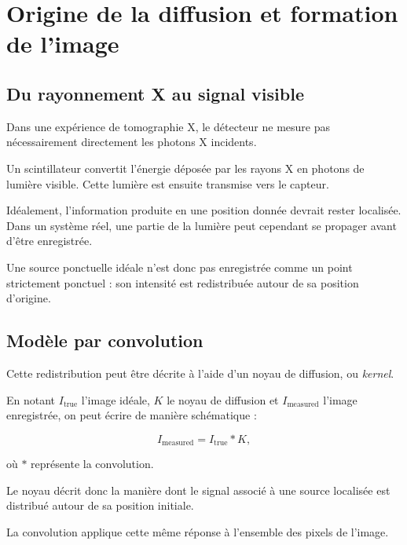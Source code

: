 \documentclass[11pt,a4paper]{report}
\begin{document}

\chapter{Origine de la diffusion et formation de l'image}

\section{Du rayonnement X au signal visible}

Dans une expérience de tomographie X, le détecteur ne mesure pas
nécessairement directement les photons X incidents.

Un scintillateur convertit l'énergie déposée par les rayons X en photons
de lumière visible. Cette lumière est ensuite transmise vers le capteur.

Idéalement, l'information produite en une position donnée devrait rester
localisée. Dans un système réel, une partie de la lumière peut cependant
se propager avant d'être enregistrée.

Une source ponctuelle idéale n'est donc pas enregistrée comme un point
strictement ponctuel : son intensité est redistribuée autour de sa
position d'origine.

\section{Modèle par convolution}

Cette redistribution peut être décrite à l'aide d'un noyau de diffusion,
ou \textit{kernel}.

En notant $I_{\mathrm{true}}$ l'image idéale, $K$ le noyau de diffusion et
$I_{\mathrm{measured}}$ l'image enregistrée, on peut écrire de manière
schématique :

\begin{equation}
I_{\mathrm{measured}}
=
I_{\mathrm{true}} * K,
\label{eq:image_convolution}
\end{equation}

où $*$ représente la convolution.

Le noyau décrit donc la manière dont le signal associé à une source
localisée est distribué autour de sa position initiale.

La convolution applique cette même réponse à l'ensemble des pixels de
l'image.
\end{document}
